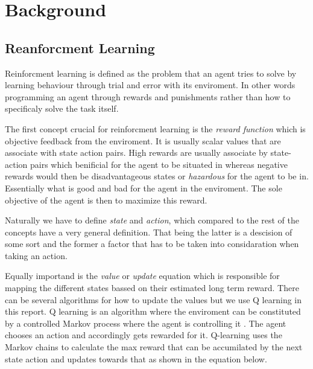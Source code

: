 \section{Background}

\subsection{Reanforcment Learning}

Reinforcment learning is defined as the problem that an agent tries to solve by learning behaviour through trial and error with its enviroment. In other words programming an agent through rewards and punishments rather than how to specificaly solve the task itself\cite{kaelbling1996reinforcement}.

The first concept crucial for reinforcment learning is the \textit{reward function} which is objective feedback from the enviroment. It is usually scalar values that are associate with state action pairs. High rewards are usually associate by state-action pairs which benificial for the agent to be situated in whereas negative rewards would then be disadvantageous states or \textit{hazardous} for the agent to be in. Essentially what is good and bad for the agent in the enviroment. The sole objective of the agent is then to maximize this reward\cite{sutton1999reinforcement}.

Naturally we have to define \textit{state} and \textit{action}, which compared to the rest of the concepts have a very general definition. That being the latter is a descision of some sort and the former a factor that has to be taken into considaration when taking an action. 

Equally importand is the \textit{value} or \textit{update} equation which is responsible for mapping the different states bassed on their estimated long term reward. There can be several algorithms for how to update the values but we use Q learning in this report. Q learning is an algorithm where the enviroment can be constituted by a controlled Markov process where the agent is controlling it \cite{watkins1992q}. The agent chooses an action and accordingly gets rewarded for it. Q-learning uses the Markov chains to calculate the max reward that can be accumilated by the next state action and updates towards that as shown in the equation below.

